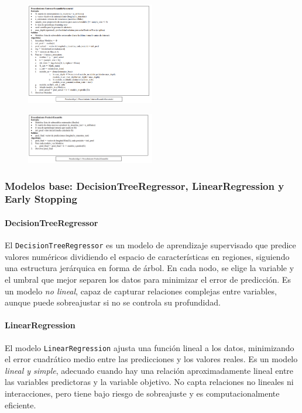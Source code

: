 \documentclass[conference,a4paper]{IEEEtran}
\begin{document}
\begin{figure}[h]
    \centering
    \includegraphics[width=0.5\textwidth]{Sin early.png}
    \caption{}
    \label{fig:2}
\end{figure}

\begin{figure}[h]
    \centering
    \includegraphics[width=0.5\textwidth]{Predict.png}
    \caption{}
    \label{fig:3}
\end{figure}

\subsubsection*{Modelos base: DecisionTreeRegressor, LinearRegression y Early Stopping}

\paragraph{DecisionTreeRegressor} 
El \texttt{DecisionTreeRegressor} es un modelo de aprendizaje supervisado que predice valores numéricos dividiendo el espacio de características en regiones, siguiendo una estructura jerárquica en forma de árbol. En cada nodo, se elige la variable y el umbral que mejor separen los datos para minimizar el error de predicción. Es un modelo \emph{no lineal}, capaz de capturar relaciones complejas entre variables, aunque puede sobreajustar si no se controla su profundidad.

\paragraph{LinearRegression} 
El modelo \texttt{LinearRegression} ajusta una función lineal a los datos, minimizando el error cuadrático medio entre las predicciones y los valores reales. Es un modelo \emph{lineal y simple}, adecuado cuando hay una relación aproximadamente lineal entre las variables predictoras y la variable objetivo. No capta relaciones no lineales ni interacciones, pero tiene bajo riesgo de sobreajuste y es computacionalmente eficiente.
\end{document}
